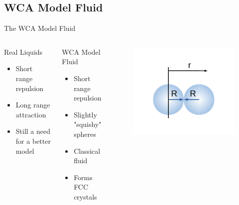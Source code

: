 \documentclass{beamer}
\begin{document}
\subsection*{WCA Model Fluid}
\begin{frame}{The WCA Model Fluid}
	\begin{columns}[t]
       	\vspace{-1em}
		\begin{block}{Real Liquids}
			\begin{itemize}
				\item Short range repulsion 
				\item Long range attraction 
				\item Still a need for a better model
			\end{itemize}
		\end{block}
		\begin{block}{WCA Model Fluid}
			\begin{itemize}
				\item Short range repulsion
				\item Slightly "squishy" spheres
				\item Classical fluid
				\item Forms FCC crystals				
			\end{itemize}
		\end{block}		
		\vspace{-3em}
          \begin{figure}
             \centering
             \includegraphics[width=1.1\columnwidth]{figs/TwoSpheresandplot.pdf} 
          \end{figure} 	 
	\end{columns}	
\end{frame}
\end{document}
